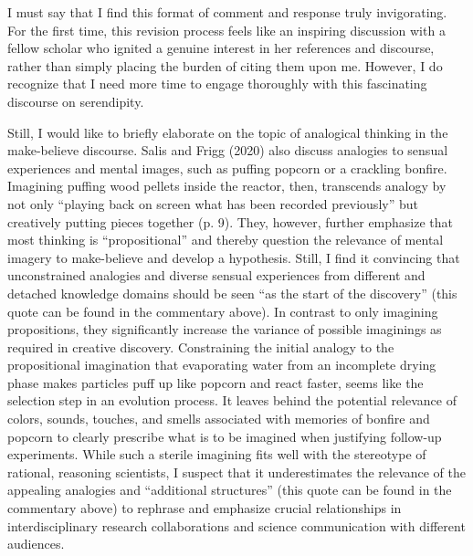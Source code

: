 \documentclass[authordate, commentary]{jote-new-article}
\begin{document}
	I must say that I find this format of comment and response truly invigorating. For the first time, this revision process feels like an inspiring discussion with a fellow scholar who ignited a genuine interest in her references and discourse, rather than simply placing the burden of citing them upon me. However, I do recognize that I need more time to engage thoroughly with this fascinating discourse on serendipity.



	Still, I would like to briefly elaborate on the topic of analogical thinking in the make-believe discourse. Salis and Frigg (2020) also discuss analogies to sensual experiences and mental images, such as puffing popcorn or a crackling bonfire. Imagining puffing wood pellets inside the reactor, then, transcends analogy by not only “playing back on screen what has been recorded previously” but creatively putting pieces together (p. 9). They, however, further emphasize that most thinking is “propositional” and thereby question the relevance of mental imagery to make-believe and develop a hypothesis. Still, I find it convincing that unconstrained analogies and diverse sensual experiences from different and detached knowledge domains should be seen “as the start of the discovery” (this quote can be found in the commentary above). In contrast to only imagining propositions, they significantly increase the variance of possible imaginings as required in creative discovery. Constraining the initial analogy to the propositional imagination that evaporating water from an incomplete drying phase makes particles puff up like popcorn and react faster, seems like the selection step in an evolution process. It leaves behind the potential relevance of colors, sounds, touches, and smells associated with memories of bonfire and popcorn to clearly prescribe what is to be imagined when justifying follow-up experiments. While such a sterile imagining fits well with the stereotype of rational, reasoning scientists, I suspect that it underestimates the relevance of the appealing analogies and “additional structures” (this quote can be found in the commentary above) to rephrase and emphasize crucial relationships in interdisciplinary research collaborations and science communication with different audiences.
\end{document}
